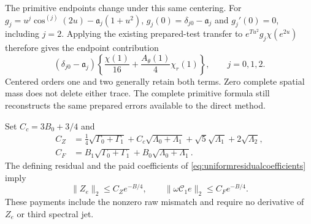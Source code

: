 \documentclass[11pt]{article}
\numberwithin{equation}{section}
\begin{document}
The primitive endpoints change under this same centering. For
$g_j=u^j\cos^{(j)}(2u)-\mathfrak a_j(1+u^2)$,
$g_j(0)=\delta_{j0}-\mathfrak a_j$ and $g_j'(0)=0$, including $j=2$.
Applying the existing prepared-test transfer to $e^{Tu^2}g_j\chi(e^{2u})$
therefore gives the endpoint contribution
\begin{equation}\label{eq:centeredprimitiveboundary}
 (\delta_{j0}-\mathfrak a_j)
       \left\{\frac{\chi(1)}{16}
                    +\frac{A_\theta(1)}4\chi_r(1)\right\},
 \qquad j=0,1,2.
\end{equation}
Centered orders one and two generally retain both terms. Zero complete
spatial mass does not delete either trace. The complete primitive formula
still reconstructs the same prepared errors available to the direct method.

Set $C_c=3B_0+3/4$ and
\begin{align}
 C_Z&=\tfrac14\sqrt{\Gamma_0+\Gamma_1}
       +C_c\sqrt{\Lambda_0+\Lambda_1}
       +\sqrt5\sqrt{\Lambda_1}+2\sqrt{\Lambda_2},\nonumber\\
 C_F&=B_1\sqrt{\Gamma_0+\Gamma_1}
                   +B_0\sqrt{\Lambda_0+\Lambda_1}.
 \label{eq:centeredresidualcosts}
\end{align}
The defining residual and the paid coefficients of
\eqref{eq:uniformresidualcoefficients} imply
\begin{equation}\label{eq:centeredresidualdecay}
 \|Z_e\|_2\le C_Ze^{-B/4},\qquad
 \|\omega\mathscr C_1e\|_2\le C_Fe^{-B/4}.
\end{equation}
These payments include the nonzero raw mismatch and require no derivative
of $Z_e$ or third spectral jet.
\end{document}
